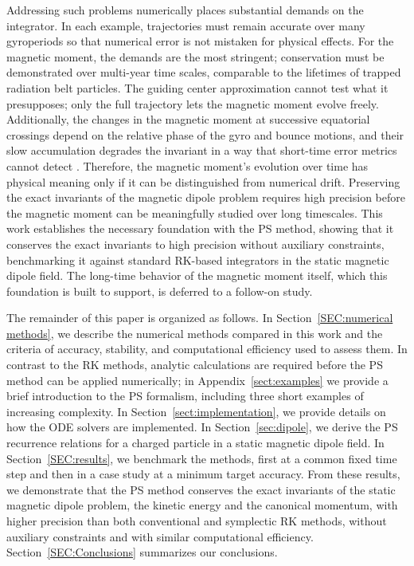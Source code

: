 \documentclass{article}
\begin{document}
Addressing such problems numerically places substantial demands on the integrator. In each example, trajectories must remain accurate over many gyroperiods so that numerical error is not mistaken for physical effects. For the magnetic moment, the demands are the most stringent; conservation must be demonstrated over multi-year time scales, comparable to the lifetimes of trapped radiation belt particles. The guiding center approximation cannot test what it presupposes; only the full trajectory lets the magnetic moment evolve freely. Additionally, the changes in the magnetic moment at successive equatorial crossings depend on the relative phase of the gyro and bounce motions, and their slow accumulation degrades the invariant in a way that short-time error metrics cannot detect \cite{DragtFinn1976, Dragt1965}. Therefore, the magnetic moment's evolution over time has physical meaning only if it can be distinguished from numerical drift. Preserving the exact invariants of the magnetic dipole problem requires high precision before the magnetic moment can be meaningfully studied over long timescales. This work establishes the necessary foundation with the PS method, showing that it conserves the exact invariants to high precision without auxiliary constraints, benchmarking it against standard RK-based integrators in the static magnetic dipole field. The long-time behavior of the magnetic moment itself, which this foundation is built to support, is deferred to a follow-on study. 

The remainder of this paper is organized as follows. In Section~\ref{SEC:numerical methods}, we describe the numerical methods compared in this work and the criteria of accuracy, stability, and computational efficiency used to assess them. In contrast to the RK methods, analytic calculations are required before the PS method can be applied numerically; in Appendix~\ref{sect:examples} we provide a brief introduction to the PS formalism, including three short examples of increasing complexity. In Section~\ref{sect:implementation}, we provide details on how the ODE solvers are implemented. In Section~\ref{sec:dipole}, we derive the PS recurrence relations for a charged particle in a static magnetic dipole field. In Section~\ref{SEC:results}, we benchmark the methods, first at a common fixed time step and then in a case study at a minimum target accuracy. From these results, we demonstrate that the PS method conserves the exact invariants of the static magnetic dipole problem, the kinetic energy and the canonical momentum, with higher precision than both conventional and symplectic RK methods, without auxiliary constraints and with similar computational efficiency. Section~\ref{SEC:Conclusions} summarizes our conclusions.
\end{document}
